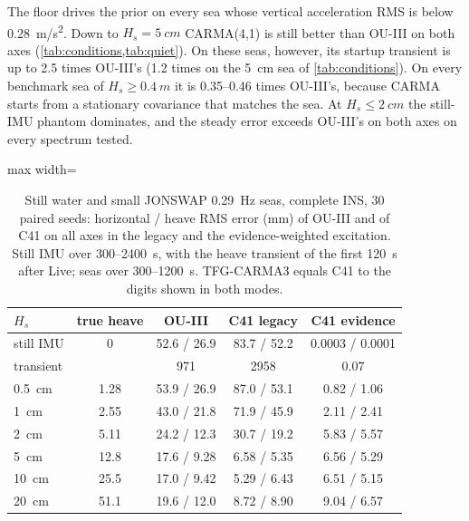 \documentclass[conference]{IEEEtran}
\theoremstyle{bodysmall}
\begin{document}
The floor drives the prior on every sea whose vertical acceleration RMS is
below \SI{0.28}{m/s^2}. Down to $H_s=\SI{5}{cm}$ CARMA(4,1) is still better
than OU-III on both axes (\cref{tab:conditions,tab:quiet}). On these seas,
however, its startup transient is up to 2.5 times OU-III's (1.2 times on the
\SI{5}{cm} sea of \cref{tab:conditions}). On every benchmark sea of
$H_s\ge\SI{0.4}{m}$ it is 0.35--0.46 times OU-III's, because CARMA starts
from a stationary covariance that matches the sea. At $H_s\le\SI{2}{cm}$ the
still-IMU phantom dominates, and the steady error exceeds OU-III's on both
axes on every spectrum tested.

\begin{table}[t]
\centering
\caption{Still water and small JONSWAP \SI{0.29}{Hz} seas, complete INS,
30 paired seeds: horizontal / heave RMS error (mm) of OU-III and of C41 on
all axes in the legacy and the evidence-weighted excitation. Still IMU over
\SI{300}{}--\SI{2400}{s}, with the heave transient of the first
\SI{120}{s} after Live; seas over \SI{300}{}--\SI{1200}{s}. TFG-CARMA3 equals
C41 to the digits shown in both modes.}
\label{tab:quiet}
\footnotesize
\setlength{\tabcolsep}{2.5pt}
\begin{adjustbox}{max width=\columnwidth}
\begin{tabular}{@{}lcccc@{}}
\toprule
$H_s$ & true heave & OU-III & C41 legacy & C41 evidence\\
\midrule
still IMU & 0 & 52.6 / 26.9 & 83.7 / 52.2 & 0.0003 / 0.0001\\
\quad transient & & 971 & 2958 & 0.07\\
\SI{0.5}{cm} & 1.28 & 53.9 / 26.9 & 87.0 / 53.1 & 0.82 / 1.06\\
\SI{1}{cm} & 2.55 & 43.0 / 21.8 & 71.9 / 45.9 & 2.11 / 2.41\\
\SI{2}{cm} & 5.11 & 24.2 / 12.3 & 30.7 / 19.2 & 5.83 / 5.57\\
\SI{5}{cm} & 12.8 & 17.6 / 9.28 & 6.58 / 5.35 & 6.56 / 5.29\\
\SI{10}{cm} & 25.5 & 17.0 / 9.42 & 5.29 / 6.43 & 6.51 / 5.15\\
\SI{20}{cm} & 51.1 & 19.6 / 12.0 & 8.72 / 8.90 & 9.04 / 6.57\\
\bottomrule
\end{tabular}
\end{adjustbox}
\end{table}
\end{document}
